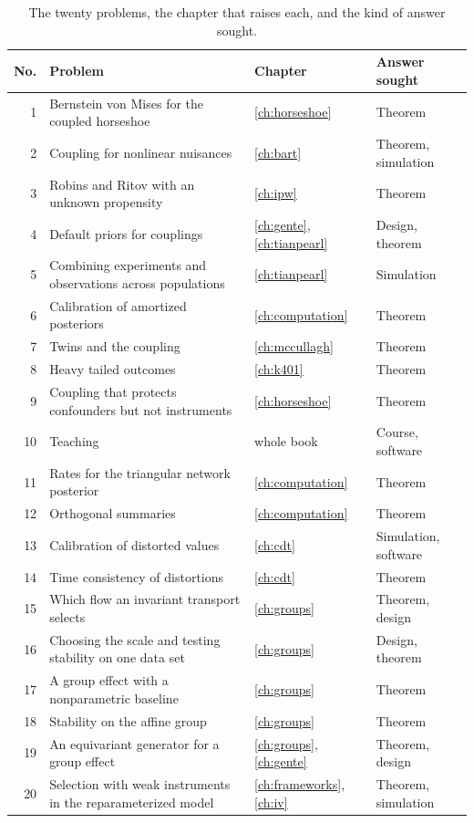 \begin{table}[ht]
\centering
\small
\caption{The twenty problems, the chapter that raises each, and the kind of answer sought.}
\label{tab:openlist}
\setlength{\tabcolsep}{3pt}
\begin{tabular}{@{}rL{1.85in}L{0.95in}L{1.15in}@{}}
\toprule
No. & Problem & Chapter & Answer sought \\
 & Bernstein von Mises for the coupled horseshoe & \ref{ch:horseshoe} & Theorem \\
2 & Coupling for nonlinear nuisances & \ref{ch:bart} & Theorem, simulation \\
3 & Robins and Ritov with an unknown propensity & \ref{ch:ipw} & Theorem \\
4 & Default priors for couplings & \ref{ch:gente}, \ref{ch:tianpearl} & Design, theorem \\
5 & Combining experiments and observations across populations & \ref{ch:tianpearl} & Simulation \\
6 & Calibration of amortized posteriors & \ref{ch:computation} & Theorem \\
7 & Twins and the coupling & \ref{ch:mccullagh} & Theorem \\
8 & Heavy tailed outcomes & \ref{ch:k401} & Theorem \\
9 & Coupling that protects confounders but not instruments & \ref{ch:horseshoe} & Theorem \\
10 & Teaching & whole book & Course, software \\
11 & Rates for the triangular network posterior & \ref{ch:computation} & Theorem \\
12 & Orthogonal summaries & \ref{ch:computation} & Theorem \\
13 & Calibration of distorted values & \ref{ch:cdt} & Simulation, software \\
14 & Time consistency of distortions & \ref{ch:cdt} & Theorem \\
15 & Which flow an invariant transport selects & \ref{ch:groups} & Theorem, design \\
16 & Choosing the scale and testing stability on one data set & \ref{ch:groups} & Design, theorem \\
17 & A group effect with a nonparametric baseline & \ref{ch:groups} & Theorem \\
18 & Stability on the affine group & \ref{ch:groups} & Theorem \\
19 & An equivariant generator for a group effect & \ref{ch:groups}, \ref{ch:gente} & Theorem, design \\
20 & Selection with weak instruments in the reparameterized model & \ref{ch:frameworks}, \ref{ch:iv} & Theorem, simulation \\
\bottomrule
\end{tabular}
\end{table}

